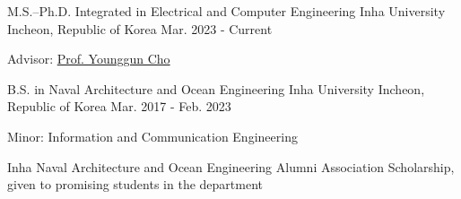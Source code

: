 
\begin{cventries}
  \cventry
    {M.S.--Ph.D. Integrated in Electrical and Computer Engineering} %
    {Inha University} %
    {Incheon, Republic of Korea} %
    {Mar. 2023 - Current} %
    {
      \begin{cvitems}
        \item Advisor: \href{https://sites.google.com/site/ygchocv/home}{Prof. Younggun Cho}
      \end{cvitems}
    }

  \cventry
    {B.S. in Naval Architecture and Ocean Engineering} %
    {Inha University} %
    {Incheon, Republic of Korea} %
    {Mar. 2017 - Feb. 2023} %
    {
      \begin{cvitems}
        \item Minor: Information and Communication Engineering
        \item Inha Naval Architecture and Ocean Engineering Alumni Association Scholarship, given to promising students in the department
      \end{cvitems}
    }
\end{cventries}
